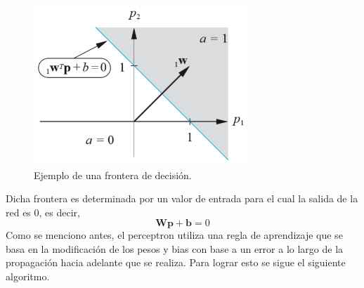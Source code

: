         \begin{figure}[H]
            \begin{center}
                \includegraphics[width=8cm]{img/perceptron/frontera.png}
                \caption{Ejemplo de una frontera de decisión. \cite{libro1}}
                \label{fig:frontera}
            \end{center}
        \end{figure}
        Dicha frontera es determinada por un valor de entrada para el cual la salida de la red es 0, es decir,
        \[\boldsymbol{Wp+b} = 0 \]
        Como se menciono antes, el perceptron utiliza una regla de aprendizaje que se basa en la modificación de los pesos y bias con base a un error a lo largo de la propagación hacia adelante que se realiza. 
        Para lograr esto se sigue el siguiente algoritmo.

